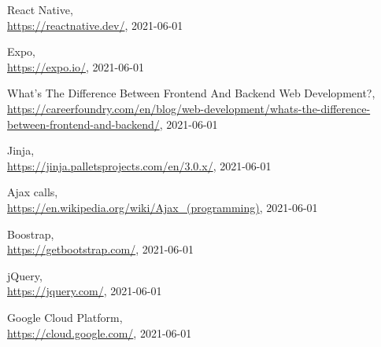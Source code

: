 \documentclass[12pt,a4paper,twoside,english,italian]{book}
\begin{document}
\begin{thebibliography}{99}
React Native, \\\url{https://reactnative.dev/}, 2021-06-01

Expo, \\\url{https://expo.io/}, 2021-06-01

What's The Difference Between Frontend And Backend Web Development?, \\\url{https://careerfoundry.com/en/blog/web-development/whats-the-difference-between-frontend-and-backend/}, 2021-06-01

Jinja, \\\url{https://jinja.palletsprojects.com/en/3.0.x/}, 2021-06-01

Ajax calls, \\\url{https://en.wikipedia.org/wiki/Ajax_(programming)}, 2021-06-01

Boostrap, \\\url{https://getbootstrap.com/}, 2021-06-01

jQuery, \\\url{https://jquery.com/}, 2021-06-01

Google Cloud Platform, \\\url{https://cloud.google.com/}, 2021-06-01


\end{thebibliography}
\nonfrenchspacing
\end{document}

